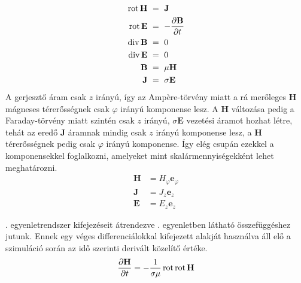             \begin{equation}\label{equ:maxwell}
                \begin{aligned}
                \operatorname{rot} \textbf{H}~&=~{\bf J} \\
                \operatorname{rot} \textbf{E}~&=~-\dfrac{\partial \textbf{B}}{\partial t} \\
                \operatorname{div} \textbf{B}~&=~0 \\
                \operatorname{div} \textbf{E}~&=~0 \\
                \textbf{B}~&=~\mu \textbf{H} \\
                \textbf{J}~&=~\sigma\textbf{E}
                \end{aligned}
            \end{equation}
            A gerjesztő áram csak $z$ irányú, így az Amp\`ere-törvény miatt a rá merőleges $\textbf{H}$ mágneses térerősségnek csak $\varphi$ irányú komponense lesz. A $\textbf{H}$ változása pedig a Faraday-törvény miatt szintén csak $z$ irányú, $\sigma\textbf{E}$ vezetési áramot hozhat létre, tehát az eredő $\textbf{J}$ áramnak mindig csak $z$ irányú komponense lesz, a $\textbf{H}$ térerősségnek pedig csak $\varphi$ irányú komponense. Így elég csupán ezekkel a komponensekkel foglalkozni, amelyeket mint skalármennyiségekként lehet meghatározni.
            \begin{equation}\label{equ:komponens}
                \begin{aligned}
                    \textbf{H} &= H_{\varphi}\textbf{e}_\varphi\\
                    \textbf{J} &= J_{z}\textbf{e}_z\\
                    \textbf{E} &= E_{z}\textbf{e}_z
                \end{aligned}
            \end{equation}
            \par
            . egyenletrendszer kifejezéseit átrendezve . egyenletben látható összefüggéshez jutunk. Ennek egy véges differenciálokkal kifejezett alakját használva áll elő a szimuláció során az idő szerinti derivált közelítő értéke.
            \begin{equation}\label{equ:dhdt}
                \begin{aligned}
                    \dfrac{\partial \textbf{H}}{\partial t} &= -\dfrac{1}{\sigma\mu}\rot\rot\textbf{H}\\%
                \end{aligned}
            \end{equation}
